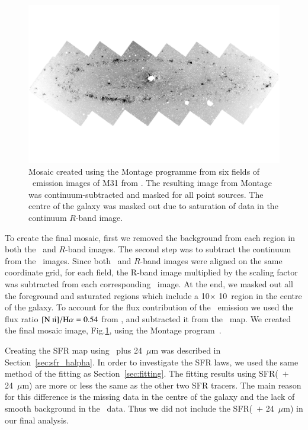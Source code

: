 \begin{figure}
\centering
\includegraphics[width=164mm]{../image_paper1/halpha.pdf}
\caption[Mosaic of H$\alpha$ emission images of M31]{Mosaic created using the Montage programme from six fields of \halpha\ emission images of M31 from \citet{Massey07}. The resulting image from Montage was continuum-subtracted and masked for all point sources. The centre of the galaxy was masked out due to saturation of data in the continuum $R$-band image.}
\label{fig:halpha}
\end{figure}

To create the final mosaic, first we removed the background from each region in both the \halpha\ and $R$-band images. The second step was to subtract the continuum from the \halpha\ images. Since both \halpha\ and $R$-band images were aligned on the same coordinate grid, for each field, the R-band image multiplied by the scaling factor was subtracted from each corresponding \halpha\ image. At the end, we masked out all the foreground and saturated regions which include a 10\arcmin $\times$ 10\arcmin\ region in the centre of the galaxy. To account for the flux contribution of the \nii\ emission we used the flux ratio $\mathrm{[N~{\textsc ii}]}/\mathrm{H}\alpha = 0.54$ from \citet{Kennicutt08}, and subtracted it from the \halpha\ map. We created the final mosaic image, Fig.\ref{fig:halpha}, using the Montage program~\citep{Berriman08}.

Creating the SFR map using \halpha\ plus 24~$\mu$m was described in Section~\ref{sec:sfr_halpha}. In order to investigate the SFR laws, we used the same method of the fitting as Section~\ref{sec:fitting}. The fitting results using SFR(\halpha\ $+$ 24~$\mu$m) are more or less the same as the other two SFR tracers. The main reason for this difference is the missing data in the centre of the galaxy and the lack of smooth background in the \halpha\ data. Thus we did not include the SFR(\halpha\ $+$ 24~$\mu$m) in our final analysis.





